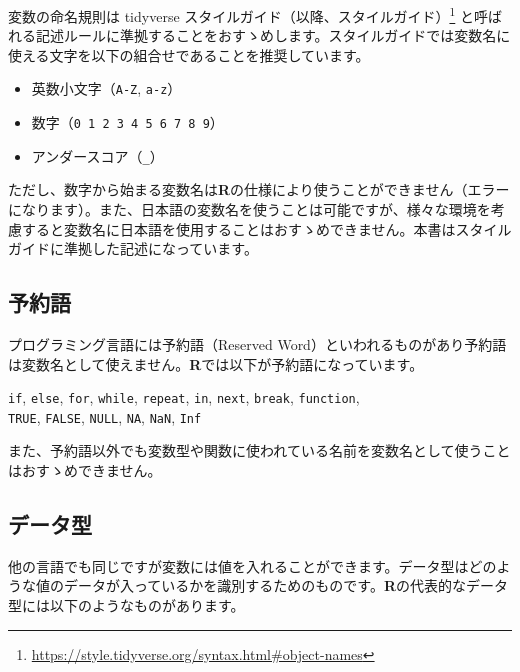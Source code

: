 \documentclass[
  12pt,
]{book}
\DeclareRobustCommand{\href}[2]{#2\footnote{\url{#1}}}
\providecommand{\tightlist}{%
  \setlength{\itemsep}{0pt}\setlength{\parskip}{0pt}}
\begin{document}
変数の命名規則は \href{https://style.tidyverse.org/syntax.html\#object-names}{tidyverse スタイルガイド（以降、スタイルガイド）} と呼ばれる記述ルールに準拠することをおすゝめします。スタイルガイドでは変数名に使える文字を以下の組合せであることを推奨しています。

\begin{itemize}
\tightlist
\item
  英数小文字（\texttt{A-Z}, \texttt{a-z}）
\item
  数字（\texttt{0\ 1\ 2\ 3\ 4\ 5\ 6\ 7\ 8\ 9}）
\item
  アンダースコア（\texttt{\_}）
\end{itemize}

ただし、数字から始まる変数名は\textbf{R}の仕様により使うことができません（エラーになります）。また、日本語の変数名を使うことは可能ですが、様々な環境を考慮すると変数名に日本語を使用することはおすゝめできません。本書はスタイルガイドに準拠した記述になっています。

\hypertarget{ux4e88ux7d04ux8a9e}{%
\subsection{予約語}\label{ux4e88ux7d04ux8a9e}}

プログラミング言語には予約語（Reserved Word）といわれるものがあり予約語は変数名として使えません。\textbf{R}では以下が予約語になっています。

\texttt{if}, \texttt{else}, \texttt{for}, \texttt{while}, \texttt{repeat}, \texttt{in}, \texttt{next}, \texttt{break}, \texttt{function},\\
\texttt{TRUE}, \texttt{FALSE}, \texttt{NULL}, \texttt{NA}, \texttt{NaN}, \texttt{Inf}

また、予約語以外でも変数型や関数に使われている名前を変数名として使うことはおすゝめできません。

\hypertarget{ux30c7ux30fcux30bfux578b}{%
\subsection{データ型}\label{ux30c7ux30fcux30bfux578b}}

他の言語でも同じですが変数には値を入れることができます。データ型はどのような値のデータが入っているかを識別するためのものです。\textbf{R}の代表的なデータ型には以下のようなものがあります。
\end{document}
